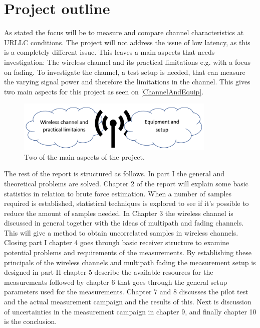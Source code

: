 \section{Project outline}

As stated the focus will be to measure and compare channel characteristics at URLLC conditions. The project will not address the issue of low latency, as this is a completely different issue. This leaves a main aspects that needs investigation: The wireless channel and its practical limitations e.g. with a focus on fading. To investigate the channel, a test setup is needed, that can measure the varying signal power and therefore the limitations in the channel. This gives two main aspects for this project as seen on \autoref{ChannelAndEquip}.

\begin{figure}[H]
\centering
\includegraphics[width=0.85\textwidth]{figures/ProOutline.png}
\caption{Two of the main aspects of the project.}
\label{ChannelAndEquip}
\end{figure}



The rest of the report is structured as follows. In part I the general and theoretical problems are solved. Chapter 2 of the report will explain some basic statistics in relation to brute force estimation. When a number of samples required is established, statistical techniques is explored to see if it's possible to reduce the amount of samples needed. In Chapter 3 the wireless channel is discussed in general together with  the ideas of multipath and fading channels. This will give a method to obtain uncorrelated samples in wireless channels. Closing part I chapter 4 goes through basic receiver structure to examine potential problems and requirements of the measurements. By establishing these principals of the wireless channels and multipath fading the measurement setup is designed in part II chapter 5 describe the available resources for the measurements followed by chapter 6 that goes through the general setup parameters used for the measurements. Chapter 7 and 8 discusses the pilot test and the actual measurement campaign and the results of this. Next is discussion of uncertainties in the measurement campaign in chapter 9, and finally chapter 10 is the conclusion.

